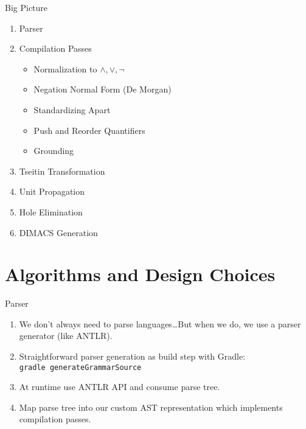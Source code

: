 \documentclass[smaller,dvipsnames]{beamer}
\begin{document}

  \begin{frame}{Big Picture}
    \begin{enumerate}
    	\item Parser
    	\item Compilation Passes
    	\begin{itemize}
    		\item Normalization to $\land, \lor, \neg$
    		\item Negation Normal Form (De Morgan)
    		\item Standardizing Apart
    		\item Push and Reorder Quantifiers
    		\item Grounding
    	\end{itemize}
    	\item Tseitin Transformation
    	\item Unit Propagation
    	\item Hole Elimination
    	\item DIMACS Generation
    \end{enumerate}
  \end{frame}


  \section{Algorithms and Design Choices}

  \begin{frame}{Parser}
    \begin{enumerate}
      \item We don't always need to parse languages\dots \newline But when we do, we use a parser generator (like ANTLR).
      \item Straightforward parser generation as build step with Gradle: \texttt{gradle~generateGrammarSource}
      \item At runtime use ANTLR API and consume parse tree.
      \item Map parse tree into our custom AST representation which implements compilation passes.
    \end{enumerate}
  \end{frame}
\end{document}
